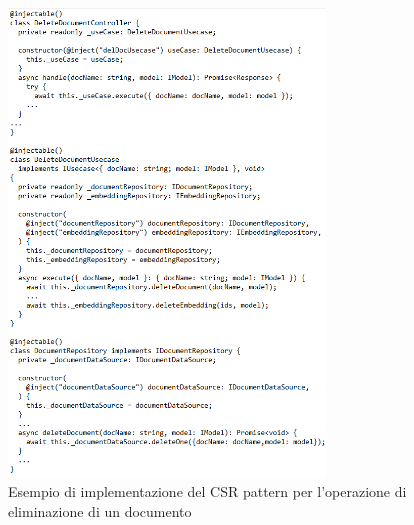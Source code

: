 \begin{figure}[h!]
    \centering  
    \includegraphics[width=0.75\textwidth]{CSR.png}
    \caption{Esempio di implementazione del CSR pattern per l'operazione di eliminazione di un documento}
\end{figure}

\newpage
